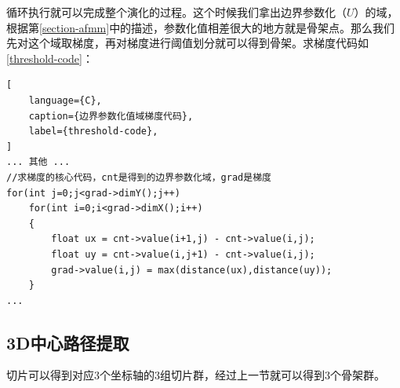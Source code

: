 循环执行就可以完成整个演化的过程。这个时候我们拿出边界参数化（$U$）的域，根据第\ref{section-afmm}中的描述，参数化值相差很大的地方就是骨架点。那么我们先对这个域取梯度，再对梯度进行阈值划分就可以得到骨架。求梯度代码如\ref{threshold-code}：
\begin{lstlisting}[
    language={C},
    caption={边界参数化值域梯度代码},
    label={threshold-code},
]
... 其他 ...
//求梯度的核心代码，cnt是得到的边界参数化域，grad是梯度
for(int j=0;j<grad->dimY();j++)	
    for(int i=0;i<grad->dimX();i++)
    {
        float ux = cnt->value(i+1,j) - cnt->value(i,j);
        float uy = cnt->value(i,j+1) - cnt->value(i,j);
        grad->value(i,j) = max(distance(ux),distance(uy));
    }
...
\end{lstlisting}


\subsection{3D中心路径提取}
切片可以得到对应3个坐标轴的3组切片群，经过上一节就可以得到3个骨架群。
